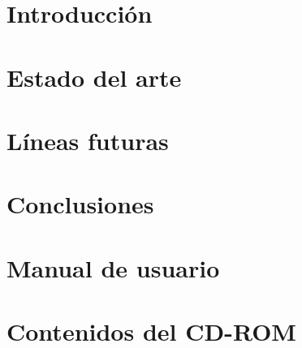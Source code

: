 \documentclass[openright,twoside,10pt]{book}
\begin{document}
\chapter{Introducción}\label{cap.introduccion}


\chapter{Estado del arte}\label{cap.arte}


\chapter{Líneas futuras}\label{cap.futuro}


\chapter{Conclusiones}\label{cap.conclusiones}


\appendix

\chapter{Manual de usuario}\label{aped.A}

\chapter{Contenidos del CD-ROM}\label{aped.B}





\cleardoublepage
{}
\end{document}
